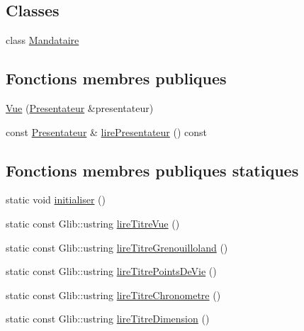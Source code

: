 \subsection*{Classes}
\begin{DoxyCompactItemize}
\item 
class \hyperlink{classgrenouilloland_1_1Vue_1_1Mandataire}{Mandataire}
\end{DoxyCompactItemize}
\subsection*{Fonctions membres publiques}
\begin{DoxyCompactItemize}
\item 
\hyperlink{classgrenouilloland_1_1Vue_a757da0d74ff38e0c6f95408ca48290df}{Vue} (\hyperlink{classgrenouilloland_1_1Presentateur}{Presentateur} \&presentateur)
\item 
const \hyperlink{classgrenouilloland_1_1Presentateur}{Presentateur} \& \hyperlink{classgrenouilloland_1_1Vue_a9ef1dcf95036a43bec9284168924a653}{lire\-Presentateur} () const 
\end{DoxyCompactItemize}
\subsection*{Fonctions membres publiques statiques}
\begin{DoxyCompactItemize}
\item 
static void \hyperlink{classgrenouilloland_1_1Vue_afdd453417b5b374129e27d739750d449}{initialiser} ()
\item 
static const Glib\-::ustring \hyperlink{classgrenouilloland_1_1Vue_a223dad39b984bc48648a69cb97b5ff6e}{lire\-Titre\-Vue} ()
\item 
static const Glib\-::ustring \hyperlink{classgrenouilloland_1_1Vue_a1c46be867356f059d3b96b909920963b}{lire\-Titre\-Grenouilloland} ()
\item 
static const Glib\-::ustring \hyperlink{classgrenouilloland_1_1Vue_a36b09d267fb47c48ca326ea88c0e946c}{lire\-Titre\-Points\-De\-Vie} ()
\item 
static const Glib\-::ustring \hyperlink{classgrenouilloland_1_1Vue_a88c78d10cc710d33358a3176e26faa51}{lire\-Titre\-Chronometre} ()
\item 
static const Glib\-::ustring \hyperlink{classgrenouilloland_1_1Vue_adf5485ae9e2d418cffe7c27d273affa8}{lire\-Titre\-Dimension} ()
\end{DoxyCompactItemize}
